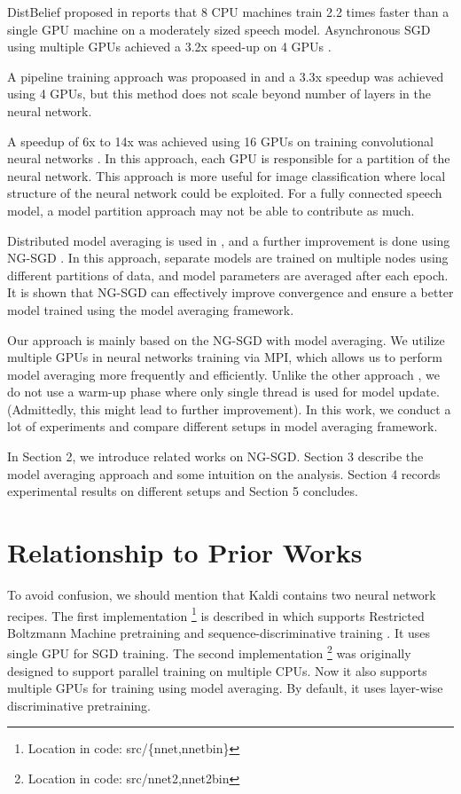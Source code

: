 \documentclass{article}
\begin{document}
DistBelief proposed in \cite{dean2012large} reports that 8 CPU machines train 2.2 times faster than a single GPU machine on a
moderately sized speech model. Asynchronous SGD using multiple GPUs achieved a 3.2x speed-up on 4 GPUs \cite{zhang2013asynchronous}.

A pipeline training approach was propoased in \cite{chen2012pipelined} and a 3.3x speedup was achieved using 4 GPUs, but this
method does not scale beyond number of layers in the neural network.

A speedup of 6x to 14x was achieved using 16 GPUs on training convolutional neural networks \cite{coates2013deep}. In this approach,
each GPU is responsible for a partition of the neural network. This approach is more useful for image classification where 
local structure of the neural network could be exploited. For a fully connected speech model, a model partition approach 
may not be able to contribute as much.

Distributed model averaging is used in \cite{zhang2014improving,miao2014distributed}, and a further improvement 
is done using NG-SGD \cite{povey2014parallel}. In this approach, separate models are trained on multiple nodes using 
different partitions of data, and model parameters are averaged after each epoch. It is shown that NG-SGD can effectively improve
convergence and ensure a better model trained using the model averaging framework.

Our approach is mainly based on the NG-SGD with model averaging. We utilize multiple GPUs in neural networks training via 
MPI, which allows us to perform model averaging more frequently and efficiently. Unlike the other approach \cite{seide20141},
we do not use a warm-up phase where only single thread is used for model update. (Admittedly, this might lead to further improvement). 
In this work, we conduct a lot of experiments and compare different setups in model averaging framework.

In Section 2, we introduce related works on NG-SGD. Section 3 describe the model averaging approach and some 
intuition on the analysis. Section 4 records experimental results on different setups and Section 5 concludes.

\section{Relationship to Prior Works}
To avoid confusion, we should mention that Kaldi\cite{kaldi11} contains two neural network recipes. The first implementation
\footnote{Location in code: src/\{nnet,nnetbin\}} is described in \cite{vesely2013sequence} which supports Restricted Boltzmann Machine 
pretraining \cite{hinton2006fast} and sequence-discriminative training \cite{povey2008boosted}. It uses single GPU 
for SGD training. The second implementation \footnote{Location in code: src/{nnet2,nnet2bin}}
\cite{zhang2014improving} was originally designed to support parallel training on multiple CPUs. Now it also supports 
multiple GPUs for training using model averaging. By default, it uses layer-wise discriminative pretraining.
\end{document}

